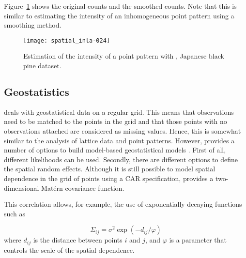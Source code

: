\documentclass[article]{jss}
\begin{document}
\noindent
Figure~\ref{fig:sppa} shows the original counts and the smoothed counts.  Note
that this is similar to estimating the intensity of an inhomogeneous point
pattern using a smoothing method.


\begin{figure}[h]
\begin{center}
\texttt{[image: spatial\_inla-024]}
\end{center}
\caption{Estimation of the intensity of a point pattern with , 
Japanese black pine dataset.}
\label{fig:sppa}
\end{figure}



\subsection{Geostatistics}


 deals with geostatistical data on a regular grid. This means
that observations need to be matched to the points in the grid and that those
points with no observations attached are considered as missing values.
Hence, this is somewhat similar to the analysis of lattice data and point
patterns. However,  provides a number of options to build 
model-based geostatistical models \citep{DiggleRibeiro:2007}. First
of all, different likelihoods can be used. Secondly, there are different
options to define the spatial random effects. Although it is still possible
to model spatial dependence in the grid of points using a CAR specification,
 provides a two-dimensional Mat\'ern covariance function. 


This correlation allows, for example, the use of exponentially decaying
functions such as 

\begin{equation}
\Sigma_{ij} = \sigma^2 \exp(-d_{ij}/\varphi)
\end{equation}
\noindent
where $d_{ij}$ is the distance between points $i$ and $j$, and $\varphi$
is a parameter that controls the scale of the spatial dependence.


%
%
%
\end{document}
